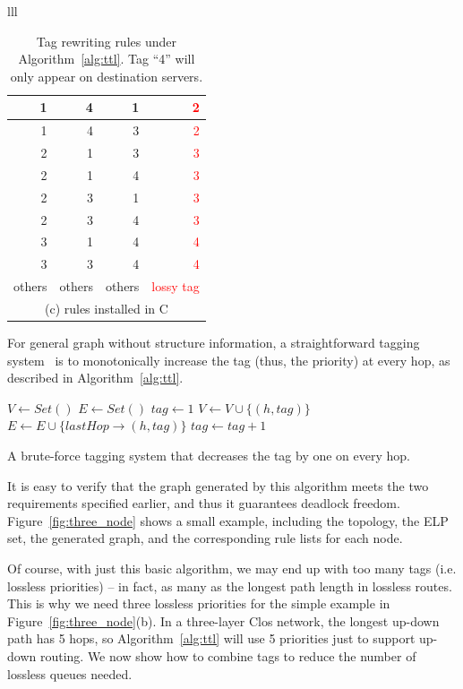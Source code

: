 \begin{table}[t]
\begin{tabular}{lll}
\begin{tabular}{|r|r|r|r|}
			\hline
			\hline
			1 & 4 & 1 & \textcolor{red}{2} \\
			\hline
			1 & 4 & 3 & \textcolor{red}{2} \\
			\hline
			2 & 1 & 3 & \textcolor{red}{3} \\
			\hline
			2 & 1 & 4 & \textcolor{red}{3} \\
			\hline
			2 & 3 & 1 & \textcolor{red}{3} \\
			\hline
			2 & 3 & 4 & \textcolor{red}{3} \\
			\hline
			3 & 1 & 4 & \textcolor{red}{4} \\
			\hline
			3 & 3 & 4 & \textcolor{red}{4} \\
			\hline
			others & others & others & \textcolor{red}{lossy tag} \\
			\hline
			\multicolumn{4}{c}{(c) rules installed in C} \\
		\end{tabular}
	\end{tabular}
	\vspace{-1em}
	\caption{Tag rewriting rules under Algorithm~\ref{alg:ttl}. Tag ``4'' will only appear on destination servers.}
	\vspace{-1em}
	\label{table:tagging_table}
\end{table}

For general graph without structure information, a straightforward tagging
system~\cite{karol2003prevention} is to monotonically increase the tag (thus,
the priority) at every hop, as described in Algorithm~\ref{alg:ttl}.

\begin{algorithm}[t]
	\small
	$V \gets Set()$\;
	$E \gets Set()$\;
	 {
		$tag \gets 1$\;
		 {
			$V \gets V \cup \{(h, tag)\}$\;
			$E \gets E \cup \{lastHop\rightarrow(h, tag)\}$\;
			$tag \gets tag+1$\;
		}
	}
	\;
    \caption{A brute-force tagging system that decreases the tag by one on every hop.}
	\label{alg:ttl}
\end{algorithm}

It is easy to verify that the graph generated by this algorithm meets the two
requirements specified earlier, and thus it guarantees deadlock freedom.
Figure~\ref{fig:three_node} shows a small example, including the topology, the
ELP set, the generated graph, and the corresponding rule
lists for each node.

Of course, with just this basic algorithm, we may end up with too many tags
(i.e. lossless priorities) -- in fact, as many as the longest path length in
lossless routes. This is why we need three lossless priorities for
the simple example in Figure~\ref{fig:three_node}(b). In a three-layer Clos
network, the longest up-down path has 5 hops, so Algorithm~\ref{alg:ttl} will use 5
priorities just to support up-down routing. We now show how to combine tags to
reduce the number of lossless queues needed.

